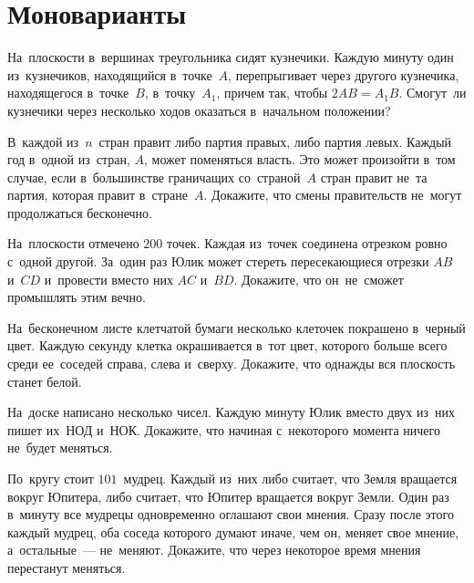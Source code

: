 
\section*{Моноварианты}


\begin{problems}

\item
На~плоскости в~вершинах треугольника сидят кузнечики.
Каждую минуту один из~кузнечиков, находящийся в~точке~$A$, перепрыгивает через
другого кузнечика, находящегося в~точке~$B$, в~точку~$A_1$, причем так, чтобы
$2 AB = A_1 B$.
Смогут~ли кузнечики через несколько ходов оказаться в~начальном положении?

\item
В~каждой из~$n$~стран правит либо партия правых, либо партия левых.
Каждый год в~одной из~стран, $A$, может поменяться власть.
Это может произойти в~том случае, если в~большинстве граничащих со~страной~$A$
стран правит не~та партия, которая правит в~стране~$A$.
Докажите, что смены правительств не~могут продолжаться бесконечно.

\item
На~плоскости отмечено $200$ точек.
Каждая из~точек соединена отрезком ровно с~одной другой.
За~один раз Юлик может стереть пересекающиеся отрезки $AB$ и~$CD$ и~провести
вместо них $AC$ и~$BD$.
Докажите, что он~не~сможет промышлять этим вечно.

\item
На~бесконечном листе клетчатой бумаги несколько клеточек покрашено в~черный
цвет.
Каждую секунду клетка окрашивается в~тот цвет, которого больше всего среди
ее~соседей справа, слева и~сверху.
Докажите, что однажды вся плоскость станет белой.

\item
На~доске написано несколько чисел.
Каждую минуту Юлик вместо двух из~них пишет их~НОД и~НОК.
Докажите, что начиная с~некоторого момента ничего не~будет меняться.

\item
По~кругу стоит $101$~мудрец.
Каждый из~них либо считает, что Земля вращается вокруг Юпитера, либо считает,
что Юпитер вращается вокруг Земли.
Один раз в~минуту все мудрецы одновременно оглашают свои мнения.
Сразу после этого каждый мудрец, оба соседа которого думают иначе, чем он,
меняет свое мнение, а~остальные~--- не~меняют.
Докажите, что через некоторое время мнения перестанут меняться.


\end{problems}
